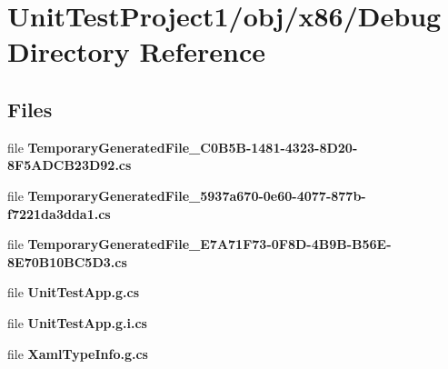 \section{Unit\+Test\+Project1/obj/x86/\+Debug Directory Reference}
\label{dir_0a20f819b195e1b0581d68194f992301}
\subsection*{Files}
\begin{DoxyCompactItemize}
\item 
file \textbf{ Temporary\+Generated\+File\+\_\+C0\+B5\+B-\/1481-\/4323-\/8\+D20-\/8\+F5\+A\+D\+C\+B23\+D92.\+cs}
\item 
file \textbf{ Temporary\+Generated\+File\+\_\+5937a670-\/0e60-\/4077-\/877b-\/f7221da3dda1.\+cs}
\item 
file \textbf{ Temporary\+Generated\+File\+\_\+\+E7\+A71\+F73-\/0\+F8\+D-\/4\+B9\+B-\/\+B56\+E-\/8\+E70\+B10\+B\+C5\+D3.\+cs}
\item 
file \textbf{ Unit\+Test\+App.\+g.\+cs}
\item 
file \textbf{ Unit\+Test\+App.\+g.\+i.\+cs}
\item 
file \textbf{ Xaml\+Type\+Info.\+g.\+cs}
\end{DoxyCompactItemize}
